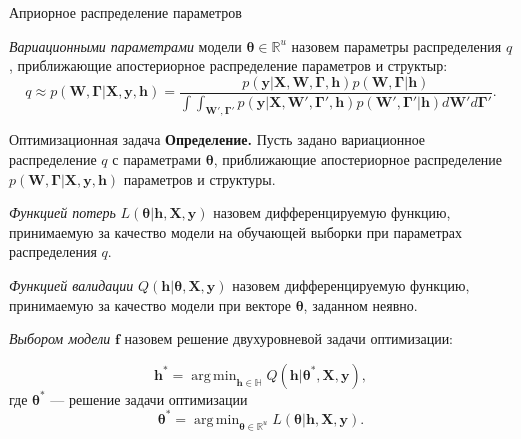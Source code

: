 \documentclass[usenames,dvipsnames,11pt,pdf,utf8,russian,aspectratio=43]{beamer}
\DeclareMathOperator*{\argmin}{arg\,min}
\begin{document}
\begin{frame}{Априорное распределение параметров}
\begin{block}{}
\textit{Вариационными параметрами} модели $\boldsymbol{\theta} \in \mathbb{R}^u$ назовем параметры распределения $q$, приближающие апостериорное распределение параметров и структыр:
\[
    q \approx p(\mathbf{W}, \boldsymbol{\Gamma}|\mathbf{X}, \mathbf{y}, \mathbf{h}) = \frac{p(\mathbf{y}|\mathbf{X},\mathbf{W},\boldsymbol{\Gamma}, \mathbf{h})p(\mathbf{W}, \boldsymbol{\Gamma}|\mathbf{h})}{\int\int_{\mathbf{W}', \boldsymbol{\Gamma'}}p(\mathbf{y}|\mathbf{X},\mathbf{W}',\boldsymbol{\Gamma}', \mathbf{h})p(\mathbf{W}', \boldsymbol{\Gamma}'|\mathbf{h})d\mathbf{W}'d\boldsymbol{\Gamma}'}.
\]
\end{block} 


\end{frame}

\begin{frame}{Оптимизационная задача}
\footnotesize
\textbf{Определение. }Пусть задано вариационное распределение $q$ с параметрами $\boldsymbol{\theta}$, приближающие апостериорное распределение $p(\mathbf{W}, \boldsymbol{\Gamma}|\mathbf{X}, \mathbf{y}, \mathbf{h})$ параметров и структуры.
\begin{block}{}

\textit{Функцией потерь} $L( \boldsymbol{\theta}| \mathbf{h}, \mathbf{X}, \mathbf{y})$   назовем дифференцируемую функцию, принимаемую за качество модели на обучающей выборки при параметрах распределения $q$.
\end{block}
\begin{block}{}
\textit{Функцией валидации} $Q(\mathbf{h}| \boldsymbol{\theta}, \mathbf{X}, \mathbf{y} )$ назовем дифференцируемую функцию, принимаемую за качество модели при векторе $\boldsymbol{\theta}$, заданном неявно.
\end{block}
\begin{block}{}
\textit{Выбором модели} $\mathbf{f}$ назовем решение двухуровневой задачи оптимизации:

\[
	\mathbf{h}^{*} = \argmin_{\mathbf{h} \in \mathbb{H}} Q(\mathbf{h}|  \boldsymbol{\theta}^{*}, \mathbf{X}, \mathbf{y} ),
\]
где $\boldsymbol{\theta}^{*}$ --- решение задачи оптимизации
\[
   \boldsymbol{\theta}^{*} = \argmin_{\boldsymbol{\theta} \in \mathbb{R}^u} L(\boldsymbol{\theta}|  \mathbf{h},  \mathbf{X}, \mathbf{y}).
\]
\end{block}


\end{frame}
\end{document}
